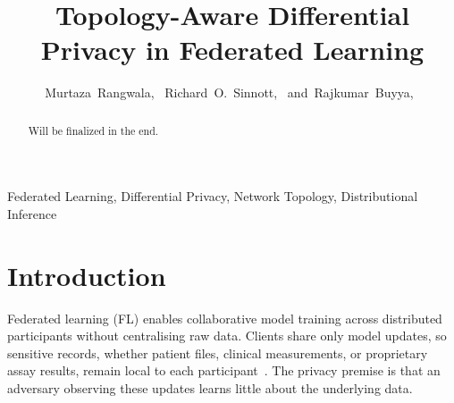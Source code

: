 \documentclass[letterpaper,journal]{IEEEtran}
\begin{document}
\title{Topology-Aware Differential Privacy in Federated Learning}

\author{Murtaza~Rangwala,~
        Richard~O.~Sinnott,~\IEEEmembership{}
        and~Rajkumar~Buyya,~
\\
}

\maketitle

\begin{abstract}
Will be finalized in the end.
\end{abstract}

\begin{IEEEkeywords}
Federated Learning, Differential Privacy, Network Topology,
Distributional Inference
\end{IEEEkeywords}

\section{Introduction}
\label{sec:intro}

Federated learning (FL) enables collaborative model training across
distributed participants without centralising raw data. Clients share
only model updates, so sensitive records, whether patient files,
clinical measurements, or proprietary assay results, remain local to
each participant~\cite{sheller2020medicine,dayan2021covid,melloddy2024,bonawitz2019sysml}.
The privacy premise is that an adversary observing these updates
learns little about the underlying data.
\end{document}
